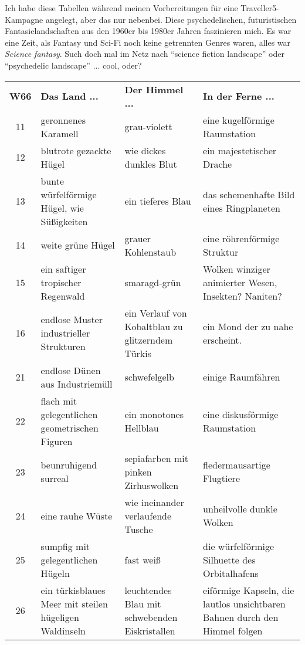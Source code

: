 \documentclass[11pt]{wbzine}
\begin{document}
Ich habe diese Tabellen während meinen Vorbereitungen für eine
Traveller5-Kampagne angelegt, aber das nur nebenbei. Diese
psychedelischen, futuristischen Fantasielandschaften aus den 1960er
bis 1980er Jahren faszinieren mich. Es war eine Zeit, als Fantasy 
und Sci-Fi noch keine getrennten Genres waren, alles war \textit{Science fantasy}.
Such doch mal im Netz nach ``science fiction landscape'' oder
``psychedelic landscape'' ... cool, oder?

\begin{tabularx}{\columnwidth}{cZZZ}
\textbf{W66} & \textbf{Das Land ...} & \textbf{Der Himmel ...} &
\textbf{In der Ferne ...} \\
11 & geronnenes Karamell & grau-violett & eine kugelförmige Raumstation \\
12 & blutrote gezackte Hügel & wie dickes dunkles Blut & ein
majestetischer Drache \\
13 & bunte würfelförmige Hügel, wie Süßigkeiten & ein tieferes Blau
& das schemenhafte Bild eines Ringplaneten \\
14 & weite grüne Hügel & grauer Kohlenstaub & eine röhrenförmige
Struktur \\
15 & ein saftiger tropischer Regenwald & smaragd-grün & Wolken
winziger animierter Wesen, Insekten? Naniten? \\
16 & endlose Muster industrieller Strukturen & ein Verlauf von
Kobaltblau zu glitzerndem Türkis & ein Mond der zu nahe erscheint.
\\
21 & endlose Dünen aus Industriemüll & schwefelgelb & einige
Raumfähren \\
22 & flach mit gelegentlichen geometrischen Figuren & ein monotones
Hellblau & eine diskusförmige Raumstation \\
23 & beunruhigend surreal & sepiafarben mit pinken Zirhuswolken &
fledermausartige Flugtiere \\
24 & eine rauhe Wüste & wie ineinander verlaufende Tusche &
unheilvolle dunkle Wolken \\
25 & sumpfig mit gelegentlichen Hügeln & fast weiß & die
würfelförmige Silhuette des Orbitalhafens \\
26 & ein türkisblaues Meer mit steilen hügeligen Waldinseln &
leuchtendes Blau mit schwebenden Eiskristallen & eiförmige Kapseln,
die lautlos unsichtbaren Bahnen durch den Himmel folgen \\
\end{tabularx}
\end{document}
